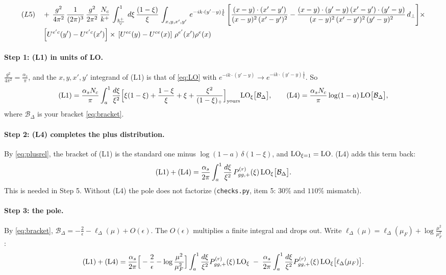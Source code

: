 \documentclass[10pt]{article}
\numberwithin{equation}{section}
\newcommand{\LO}{{\rm LO}}
\begin{document}
\begin{align}
(L5)\quad& +\,\frac{g^{2}}{4\pi^{2}}\, \frac{1}{(2\pi)^{3}}\,\frac{g^{2}}{2\pi^{2}}\, \frac{N_{c}}{k^{+}}\,\int_{\frac{k^{+}}{\vee}}^{1}\,d\xi\, \frac{(1-\xi)}{\xi}\, \int_{x,y,x',y'}\,e^{-ik\cdot (y'-y)\frac{1}{\xi}}\,\Bigg[\frac{(x-y)\cdot (x'-y')}{(x-y)^{2}\, (x'-y')^{2}} -\frac{(x-y)\cdot (y'-y)\, (x'-y')\cdot (y'-y)}{(x-y)^{2}\,(x'-y')^{2}\,(y'-y)^{2}}\,d_{\perp}\Bigg]\times\notag \\ &  \left[U^{e'c}(y') - U^{e'c}(x')\right] \times\, \left[U^{ec}(y) - U^{ce}(x)\right]\, \rho^{e'}(x') \rho^{e}(x)
\end{align}

\paragraph{Step 1: (L1) in units of LO.} $\frac{g^2}{4\pi^2}=\frac{\alpha_s}{\pi}$, and the $x,y,x',y'$ integrand of (L1) is that of \eqref{eq:LO} with $e^{-ik\cdot(y'-y)}\to e^{-ik\cdot(y'-y)\frac1\xi}$. So
\begin{equation}
({\rm L1})=\frac{\alpha_sN_c}{\pi}\int_a^1\frac{d\xi}{\xi^2}\Big[\xi(1-\xi)+\frac{1-\xi}{\xi}+\xi+\frac{\xi^2}{(1-\xi)_+}\Big]_{\rm yours}{\rm LO}_\xi\big[\mathcal B_\Delta\big],\qquad({\rm L4})=\frac{\alpha_sN_c}{\pi}\log(1-a)\,\LO\big[\mathcal B_\Delta\big],
\end{equation}
where $\mathcal B_\Delta$ is your bracket \eqref{eq:bracket}.

\paragraph{Step 2: (L4) completes the plus distribution.} By \eqref{eq:plusrel}, the bracket of (L1) is the standard one minus $\log(1-a)\,\delta(1-\xi)$, and ${\rm LO}_{\xi=1}=\LO$. (L4) adds this term back:
\begin{equation}
({\rm L1})+({\rm L4})=\frac{\alpha_s}{2\pi}\int_a^1\frac{d\xi}{\xi^2}\,P^{(r)}_{gg,+}(\xi)\,{\rm LO}_\xi\big[\mathcal B_\Delta\big].
\end{equation}
This is needed in Step 5. Without (L4) the pole does not factorize (\texttt{checks.py}, item 5: $30\%$ and $110\%$ mismatch).

\paragraph{Step 3: the pole.} By \eqref{eq:bracket}, $\mathcal B_\Delta=-\frac2\epsilon-\ell_\Delta(\mu)+O(\epsilon)$. The $O(\epsilon)$ multiplies a finite integral and drops out. Write $\ell_\Delta(\mu)=\ell_\Delta(\mu_F)+\log\frac{\mu^2}{\mu_F^2}$:
\begin{equation}
({\rm L1})+({\rm L4})=\frac{\alpha_s}{2\pi}\Big[-\frac2\epsilon-\log\frac{\mu^2}{\mu_F^2}\Big]\int_a^1\frac{d\xi}{\xi^2}P^{(r)}_{gg,+}(\xi)\,{\rm LO}_\xi\;-\;\frac{\alpha_s}{2\pi}\int_a^1\frac{d\xi}{\xi^2}P^{(r)}_{gg,+}(\xi)\,{\rm LO}_\xi\big[\ell_\Delta(\mu_F)\big].\label{eq:step3}
\end{equation}
\end{document}
